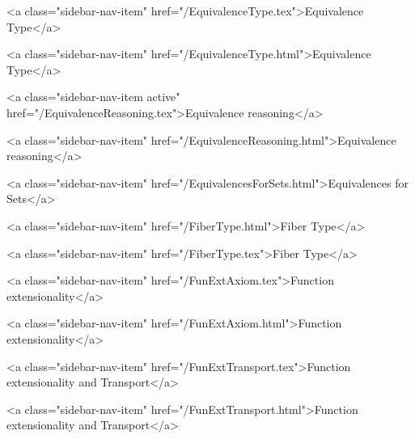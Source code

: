       
        
          <a class="sidebar-nav-item" href="/EquivalenceType.tex">Equivalence Type</a>
        
      
    
      
        
          <a class="sidebar-nav-item" href="/EquivalenceType.html">Equivalence Type</a>
        
      
    
      
        
          <a class="sidebar-nav-item active" href="/EquivalenceReasoning.tex">Equivalence reasoning</a>
        
      
    
      
        
          <a class="sidebar-nav-item" href="/EquivalenceReasoning.html">Equivalence reasoning</a>
        
      
    
      
        
          <a class="sidebar-nav-item" href="/EquivalencesForSets.html">Equivalences for Sets</a>
        
      
    
      
        
          <a class="sidebar-nav-item" href="/FiberType.html">Fiber Type</a>
        
      
    
      
        
          <a class="sidebar-nav-item" href="/FiberType.tex">Fiber Type</a>
        
      
    
      
        
          <a class="sidebar-nav-item" href="/FunExtAxiom.tex">Function extensionality</a>
        
      
    
      
        
          <a class="sidebar-nav-item" href="/FunExtAxiom.html">Function extensionality</a>
        
      
    
      
        
          <a class="sidebar-nav-item" href="/FunExtTransport.tex">Function extensionality and Transport</a>
        
      
    
      
        
          <a class="sidebar-nav-item" href="/FunExtTransport.html">Function extensionality and Transport</a>
        
